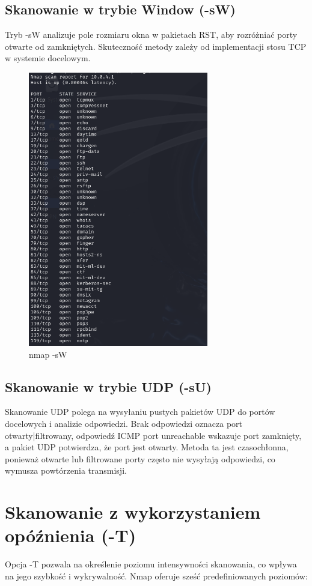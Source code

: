 \documentclass{article}
\begin{document}
\subsection*{Skanowanie w trybie Window (-sW)}
Tryb -sW analizuje pole rozmiaru okna w pakietach RST, aby rozróżniać porty otwarte od zamkniętych. Skuteczność metody zależy od implementacji stosu TCP w systemie docelowym.

\begin{figure}[H]
  \centering
  \includegraphics[width=0.7\textwidth]{nmap_sW.png}
  \caption{nmap -sW}
\end{figure}

\subsection*{Skanowanie w trybie UDP (-sU)}
Skanowanie UDP polega na wysyłaniu pustych pakietów UDP do portów docelowych i analizie odpowiedzi. Brak odpowiedzi oznacza port otwarty|filtrowany, odpowiedź ICMP port unreachable wskazuje port zamknięty, a pakiet UDP potwierdza, że port jest otwarty. Metoda ta jest czasochłonna, ponieważ otwarte lub filtrowane porty często nie wysyłają odpowiedzi, co wymusza powtórzenia transmisji.

\section*{Skanowanie z wykorzystaniem opóźnienia (-T)}
Opcja -T pozwala na określenie poziomu intensywności skanowania, co wpływa na jego szybkość i wykrywalność. Nmap oferuje sześć predefiniowanych poziomów:
\end{document}
